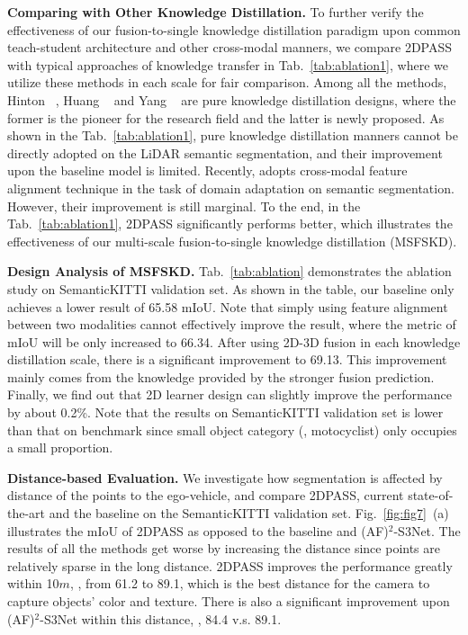 \documentclass[runningheads]{llncs}
\begin{document}
	
	\noindent\textbf{Comparing with Other Knowledge Distillation.}
	To further verify the effectiveness of our fusion-to-single knowledge distillation paradigm upon common teach-student architecture and other cross-modal manners, we compare 2DPASS with typical approaches of knowledge transfer in Tab.~\ref{tab:ablation1}, where we utilize these methods in each scale for fair comparison.
Among all the methods, Hinton \etal~\cite{hinton2015distilling}, Huang \etal~\cite{huang2021revisiting} and Yang \etal~\cite{yang2021knowledge} are pure knowledge distillation designs, where the former is the pioneer for the research field and the latter is newly proposed.
As shown in the Tab.~\ref{tab:ablation1}, pure knowledge distillation manners cannot be directly adopted on the LiDAR semantic segmentation, and their improvement upon the baseline model is limited.
Recently, \cite{jaritz2020xmuda} adopts cross-modal feature alignment technique in the task of domain adaptation on semantic segmentation.
However, their improvement is still marginal.
To the end, in the Tab.~\ref{tab:ablation1}, 2DPASS significantly performs better, which illustrates the effectiveness of our multi-scale fusion-to-single knowledge distillation (MSFSKD).
	
	\noindent\textbf{Design Analysis of MSFSKD.}
	Tab.~\ref{tab:ablation} demonstrates the ablation study on SemanticKITTI validation set.
As shown in the table, our baseline only achieves a lower result of 65.58 mIoU.
Note that simply using feature alignment between two modalities cannot effectively improve the result, where the metric of mIoU will be only increased to 66.34.
After using 2D-3D fusion in each knowledge distillation scale, there is a significant improvement to 69.13.
This improvement mainly comes from the knowledge provided by the stronger fusion prediction.
Finally, we find out that 2D learner design can slightly improve the performance by about 0.2\%.
Note that the results on SemanticKITTI validation set is lower than that on benchmark since small object category (\ie, motocyclist) only occupies a small proportion.
	

	
	\noindent\textbf{Distance-based Evaluation.}
	We investigate how segmentation is affected by distance of the points to the ego-vehicle, and compare 2DPASS, current state-of-the-art and the baseline on the SemanticKITTI validation set.
Fig.~\ref{fig:fig7}~(a) illustrates the mIoU of 2DPASS as opposed to the baseline and (AF)$^2$-S3Net.
The results of all the methods get worse by increasing the distance since points are relatively sparse in the long distance. 
2DPASS improves the performance greatly within 10$m$, \ie, from 61.2 to 89.1, which is the best distance for the camera to capture objects' color and texture.
There is also a significant improvement upon (AF)$^2$-S3Net within this distance, \ie, 84.4 v.s. 89.1.
	
\end{document}
